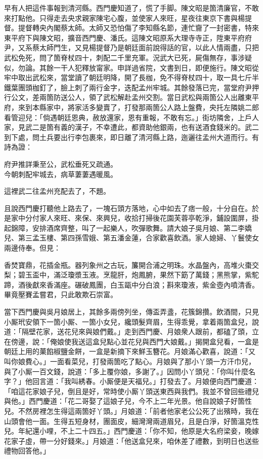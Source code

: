 早有人把這件事報到清河縣。西門慶知道了，慌了手脚。陳文昭是箇清廉官，不敢來打點他。只得走去央求親家陳宅心腹，並使家人來旺，{}星夜往東京下書與楊提督。提督轉央內閣蔡太師。太師又恐怕傷了李知縣名節，{}連忙齎了一封密書，特來東平府下與陳文昭，擴音西門慶、潘氏。這陳文昭原系大理寺寺正，陞東平府府尹，又系蔡太師門生，又見楊提督乃是朝廷面前說得話的官，以此人情兩盡，只把武松免死，問了箇脊杖四十，刺配二千里充軍。況武大已死，屍傷無存，事涉疑似，勿論。其餘一干人犯釋放甯家。申詳過省院，文書到日，即便施行。陳文昭從牢中取出武松來，當堂讀了朝廷明降，開了長枷，免不得脊杖四十，取一具七斤半鐵葉團頭枷釘了，臉上刺了兩行金字，迭配孟州牢城。其餘發落已完，當堂府尹押行公文，差兩箇防送公人，領了武松解赴孟州交割。當日武松與兩箇公人出離東平府，來到本縣家中，將家活多變賣了，打發那兩箇公人路上盤費，央托左隣姚二郎看管迎兒：「倘遇朝廷恩典，赦放還家，恩有重報，不敢有忘。」街坊隣舍，上戶人家，見武二是箇有義的漢子，不幸遭此，都資助他銀兩，也有送酒食錢米的。武二到下處，問土兵要出行李包裹來，即日離了清河縣上路，迤邐往孟州大道而行。有詩為證：

\begin{myquote}
府尹推詳秉至公，武松垂死又疏通。\\今朝刺配牢城去，病草萋萋遇暖風。
\end{myquote}

這裡武二往孟州充配去了，不題。

且說西門慶打聽他上路去了，一塊石頭方落地，心中如去了痞一般，十分自在。於是家中分付家人來旺、來保、來興兒，收拾打掃後花園芙蓉亭乾淨，鋪設圍屏，掛起錦障，安排酒席齊整，叫了一起樂人，吹彈歌舞。請大娘子吳月娘、第二李嬌兒、第三孟玉樓、第四孫雪娥、第五潘金蓮，合家歡喜飲酒。家人媳婦、丫鬟使女兩邊侍奉。但見：

\begin{myquote}
香焚寶鼎，花插金瓶。器列象州之古玩，簾開合浦之明珠。水晶盤內，高堆火棗交梨；碧玉盃中，滿泛瓊漿玉液。烹龍肝，炮鳳腑，果然下筯了萬錢；黑熊掌，紫駝蹄，酒後獻來香滿座。碾破鳳團，白玉甌中分白浪；斟來瓊液，紫金壺內噴清香。畢竟壓賽孟嘗君，只此敢欺石崇富。
\end{myquote}

當下西門慶與吳月娘居上，其餘多兩傍列坐，傳盃弄盞，花簇錦攢。飲酒間，只見小厮玳安領下一箇小厮、一箇小女兒，纔頭髮齊眉，生得乖覺，拿着兩箇盒兒，說道：「隔壁花家，送花兒來與娘們戴。」走到西門慶、月娘衆人跟前，都磕了頭，立在傍邊，說：「俺娘使我送這盒兒點心並花兒與西門大娘戴。」揭開盒兒看，一盒是朝廷上用的菓餡椒鹽金餅，一盒是新摘下來鮮玉簪花。月娘滿心歡喜，說道：「又叫你娘費心。」一面看菜兒，打發兩箇吃了點心。月娘與了那小丫頭一方汗巾兒，與了小厮一百文錢，說道：「多上覆你娘，多謝了。」因問小丫頭兒：「你叫什麼名字？」他回言道：「我叫綉春。小厮便是天福兒。」打發去了。月娘便向西門慶道：「咱這花家娘子兒，倒且是好，常時使小厮丫頭送東西與我們。我並不曾回些禮兒與他。」西門慶道：「花二哥娶了這娘子兒，今不上二年光景。他自說娘子好箇性兒。不然房裡怎生得這兩箇好丫頭。」{}{}月娘道：「前者他家老公公死了出殯時，我在山頭會他一面。生得五短身材，團面皮，細灣灣兩道眉兒，且是白淨，好箇溫克性兒。年紀還小哩，不上二十四五。」西門慶道：「你不知，他原是大名府梁妾，晚嫁花家子虛，帶一分好錢來。」月娘道：「他送盒兒來，咱休差了禮數，到明日也送些禮物回答他。」


